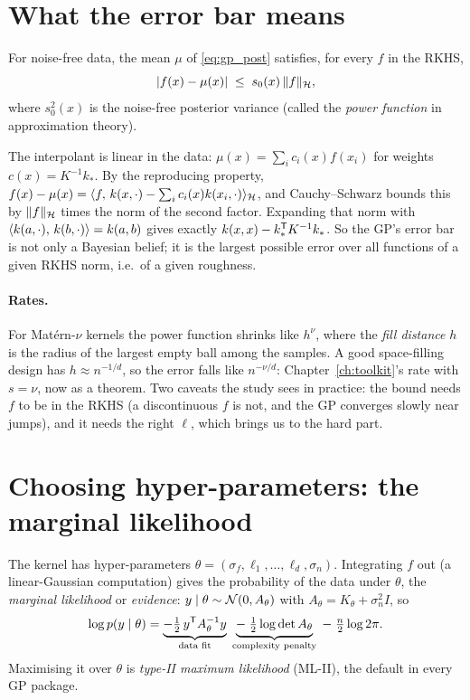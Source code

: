 \section{What the error bar means}

\begin{result}
\label{res:power}
For noise-free data, the mean $\mu$ of \eqref{eq:gp_post} satisfies, for every $f$ in the RKHS,
\begin{equation}
  |f(x) - \mu(x)| \;\le\; s_0(x)\, \lVert f\rVert_{\mathcal{H}} ,
\end{equation}
where $s_0^2(x)$ is the noise-free posterior variance (called the \emph{power function} in approximation theory).
\end{result}
\begin{intuition}
The interpolant is linear in the data: $\mu(x) = \sum_i c_i(x) f(x_i)$ for weights $c(x) = K^{-1}k_*$. By the
reproducing property,
$f(x) - \mu(x) = \langle f,\, k(x,\cdot) - \sum_i c_i(x) k(x_i,\cdot)\rangle_{\mathcal{H}}$, and Cauchy--Schwarz bounds this by
$\lVert f\rVert_{\mathcal{H}}$ times the norm of the second factor. Expanding that norm with $\langle k(a,\cdot),\, k(b,\cdot)\rangle =
k(a,b)$ gives exactly $k(x,x) - k_*^{\mathsf{T}} K^{-1} k_*$. So the GP's error bar is not only a Bayesian belief; it is the
largest possible error over all functions of a given RKHS norm, i.e.\ of a given roughness.
\end{intuition}

\paragraph{Rates.} For Mat\'ern-$\nu$ kernels the power function shrinks like $h^{\nu}$, where the \emph{fill distance}
$h$ is the radius of the largest empty ball among the samples. A good space-filling design has $h \approx n^{-1/d}$,
so the error falls like $n^{-\nu/d}$: Chapter~\ref{ch:toolkit}'s rate with $s = \nu$, now as a theorem. Two caveats
the study sees in practice: the bound needs $f$ to be in the RKHS (a discontinuous $f$ is not, and the GP converges
slowly near jumps), and it needs the right $\ell$, which brings us to the hard part.

\section{Choosing hyper-parameters: the marginal likelihood}
\label{sec:ml2}

The kernel has hyper-parameters $\theta = (\sigma_f, \ell_1,\dots,\ell_d, \sigma_n)$. Integrating $f$ out
(a linear-Gaussian computation) gives the probability of the data under $\theta$, the \emph{marginal likelihood} or
\emph{evidence}: $y \mid \theta \sim \mathcal{N}(0, A_\theta)$ with $A_\theta = K_\theta + \sigma_n^2 I$, so
\begin{equation}
  \log p(y\mid\theta) =
  \underbrace{-\tfrac12\, y^{\mathsf{T}} A_\theta^{-1} y}_{\text{data fit}}
  \;\underbrace{-\;\tfrac12 \log\det A_\theta}_{\text{complexity penalty}}
  \;-\; \tfrac n2 \log 2\pi .
  \label{eq:lml}
\end{equation}
Maximising it over $\theta$ is \emph{type-II maximum likelihood} (ML-II), the default in every GP package.

